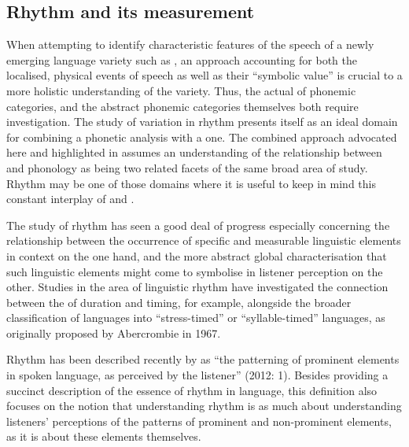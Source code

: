 \documentclass[output=paper]{langsci/langscibook}
\begin{document}
\subsection{Rhythm and its measurement}
\label{sec:key:grech2.1}
When attempting to identify characteristic features of the speech of a newly emerging language variety such as , an approach accounting for both the localised, physical events of speech as well as their “symbolic value” \citep[348]{Ladd2011} is crucial to a more holistic understanding of the variety. Thus, the actual  of phonemic categories, and the abstract phonemic categories themselves both require investigation. The study of variation in rhythm presents itself as an ideal domain for combining a phonetic analysis with a  one. The combined approach advocated here and highlighted in \citet{Ladd2011} assumes an understanding of the relationship between  and pho\-nol\-o\-gy as being two related facets of the same broad area of study. Rhythm may be one of those domains where it is useful to keep in mind this constant interplay of  and . 

The study of rhythm has seen a good deal of progress especially concerning the relationship between the occurrence of specific and measurable linguistic elements in context on the one hand, and the more abstract global characterisation that such linguistic elements might come to symbolise in listener perception on the other. Studies in the area of linguistic rhythm have investigated the connection between the  of duration and timing, for example, alongside the broader  classification of languages into “stress-timed” or “syllable-timed” languages, as originally proposed by Abercrombie in 1967.

Rhythm has been described recently by \citet{NokesHay2012} as “the patterning of prominent elements in spoken language, as perceived by the listener” (2012: 1). Besides providing a succinct description of the essence of rhythm in language, this definition also focuses on the notion that understanding rhythm is as much about understanding listeners' perceptions of the patterns of prominent and non-prominent elements, as it is about these elements themselves. 
\end{document}
